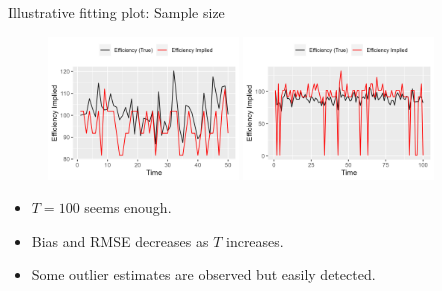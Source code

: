 \documentclass[aspectratio=169]{beamer}
\begin{document}
\begin{frame}{Illustrative fitting plot: Sample size}
\begin{figure}[!ht]
  \begin{center}

  \includegraphics[width = 0.45\textwidth]
  {figuretable/illustrative_plot_implied_efficiency_num_time_50_cobb_douglas_0.3_AR1_I0_va_dependency_0.png}
  \includegraphics[width = 0.45\textwidth]
  {figuretable/illustrative_plot_implied_efficiency_num_time_100_cobb_douglas_0.3_AR1_I0_va_dependency_0.png}
  \end{center}
  \footnotesize
\end{figure}
\begin{itemize}
     \item $T=100$ seems enough.
     \item Bias and RMSE decreases as $T$ increases. 
     \item Some outlier estimates are observed but easily detected.
\end{itemize}
\end{frame}


\end{document}

